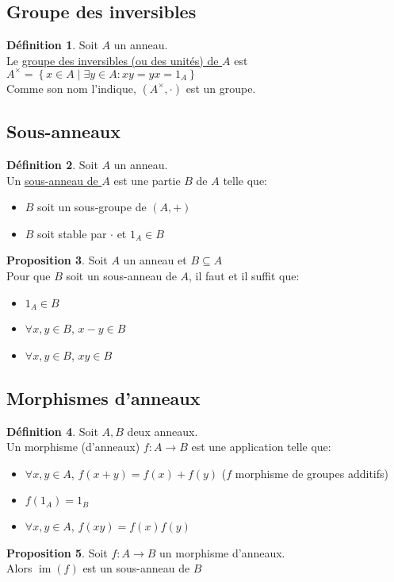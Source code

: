 \documentclass[10pt,a4paper]{article}
\theoremstyle{definition}
\newtheorem{proposition}{Proposition}[section]
\newtheorem{definition}[proposition]{Définition}
\DeclareMathOperator{\im}{im}
\begin{document}
\subsection{Groupe des inversibles}
\begin{definition}
Soit $A$ un anneau. \\
Le \uline{groupe des inversibles (ou des unités) de $A$} est $A^\times = \left\{ x \in A \mid \exists y \in A: xy = yx = 1_A \right\}$ \\
Comme son nom l'indique, $(A^\times, \cdot)$ est un groupe.
\end{definition}

\subsection{Sous-anneaux}
\begin{definition}
Soit $A$ un anneau. \\
Un \uline{sous-anneau de $A$} est une partie $B$ de $A$ telle que:
\begin{itemize}
\item $B$ soit un sous-groupe de $(A, +)$
\item $B$ soit stable par $\cdot$ et $1_A \in B$
\end{itemize}
\end{definition}
\begin{proposition}
Soit $A$ un anneau et $B \subseteq A$ \\
Pour que $B$ soit un sous-anneau de $A$, il faut et il suffit que:
\begin{itemize}
\item $1_A \in B$
\item $\forall x, y \in B$, $x - y \in B$
\item $\forall x, y \in B$, $xy \in B$
\end{itemize}
\end{proposition}

\subsection{Morphismes d'anneaux}
\begin{definition}
Soit $A, B$ deux anneaux. \\
Un morphisme (d'anneaux) $f: A \to B$ est une application telle que:
\begin{itemize}
\item $\forall x, y \in A$, $f(x + y) = f(x) + f(y)$ \quad ($f$ morphisme de groupes additifs)
\item $f(1_A) = 1_B$
\item $\forall x, y \in A$, $f(xy) = f(x) f(y)$
\end{itemize}
\end{definition}
\begin{proposition}
Soit $f: A \to B$ un morphisme d'anneaux. \\
Alors $\im(f)$ est un sous-anneau de $B$
\end{proposition}
\end{document}
